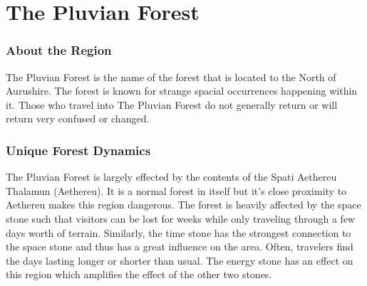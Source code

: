 \section{The Pluvian Forest}

\subsubsection{About the Region}

The Pluvian Forest is the name of the forest that is located to the North of Aurushire. The forest is known for strange spacial occurrences happening within it. Those who travel into The Pluvian Forest do not generally return or will return very confused or changed.

\subsubsection{Unique Forest Dynamics}

The Pluvian Forest is largely effected by the contents of the Spati Aethereu Thalamun (Aethereu). It is a normal forest in itself but it's close proximity to Aethereu makes this region dangerous. The forest is heavily affected by the space stone such that visitors can be lost for weeks while only traveling through a few days worth of terrain. Similarly, the time stone has the strongest connection to the space stone and thus has a great influence on the area. Often, travelers find the days lasting longer or shorter than usual. The energy stone has an effect on this region which amplifies the effect of the other two stones.

